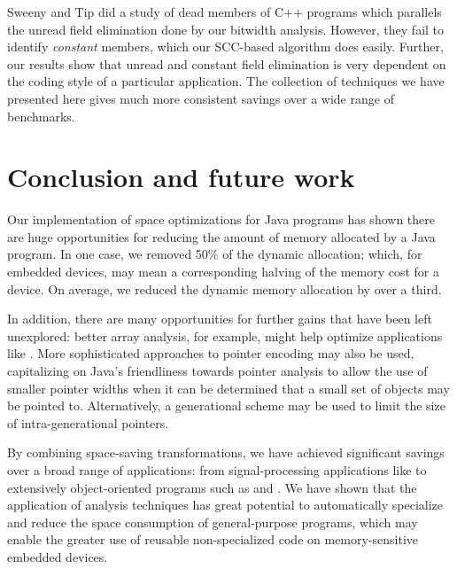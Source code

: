 \documentclass[preprint]{acmconf}
\begin{document}
Sweeny and Tip \cite{SweeneyTip98DeadDataMembers} did a study of dead
members of C++ programs which parallels the unread field
elimination done by our bitwidth analysis.  However, they
fail to identify {\it constant} members, which our SCC-based algorithm
does easily.  Further, our results show that unread and constant field
elimination is very dependent on the coding style of a particular
application.  The collection of techniques we have presented here
gives much more consistent savings over a wide range of benchmarks.

\section{Conclusion and future work}
Our implementation of space optimizations for Java programs has shown
there are huge opportunities for reducing the amount of memory
allocated by a Java program.  In one case, we removed 50\% of the
dynamic allocation; which, for embedded devices, may mean a
corresponding halving of the memory cost for a device.
On average, we reduced the dynamic memory allocation by over a third.

In addition, there are many opportunities for further gains that have
been left unexplored: better array analysis, for example, might help
optimize applications like .  More sophisticated
approaches to pointer encoding may also be used, capitalizing on
Java's friendliness towards pointer analysis
to allow the use of smaller pointer widths when
it can be determined that a small set of objects may be pointed
to.  Alternatively, a generational scheme may be used to limit the
size of intra-generational pointers.

By combining space-saving transformations, we have achieved
significant savings over a broad range of applications: from
signal-processing applications like  to
extensively object-oriented programs such as  and
.
We have shown that the application of analysis techniques has great
potential to automatically specialize and reduce the space consumption
of general-purpose programs,
which may enable the greater use of reusable non-specialized code on
memory-sensitive embedded devices.





%
\end{document}
